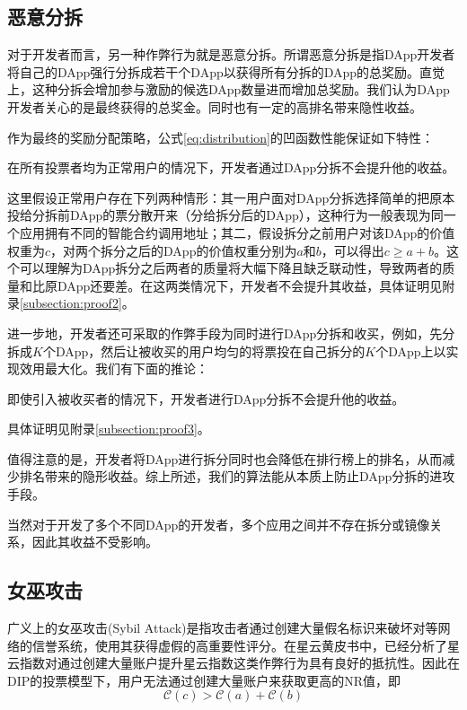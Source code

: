 \subsection{恶意分拆}

对于开发者而言，另一种作弊行为就是恶意分拆。所谓恶意分拆是指DApp开发者将自己的DApp强行分拆成若干个DApp以获得所有分拆的DApp的总奖励。直觉上，这种分拆会增加参与激励的候选DApp数量进而增加总奖励。我们认为DApp开发者关心的是最终获得的总奖金。同时也有一定的高排名带来隐性收益。

作为最终的奖励分配策略，公式\ref{eq:distribution}的凹函数性能保证如下特性：
\begin{property}
	在所有投票者均为正常用户的情况下，开发者通过DApp分拆不会提升他的收益。
\end{property}
这里假设正常用户存在下列两种情形：其一用户面对DApp分拆选择简单的把原本投给分拆前DApp的票分散开来（分给拆分后的DApp），这种行为一般表现为同一个应用拥有不同的智能合约调用地址；其二，假设拆分之前用户对该DApp的价值权重为$c$，对两个拆分之后的DApp的价值权重分别为$a$和$b$，可以得出$c \geq a+b$。这个可以理解为DApp拆分之后两者的质量将大幅下降且缺乏联动性，导致两者的质量和比原DApp还要差。在这两类情况下，开发者不会提升其收益，具体证明见附录\ref{subsection:proof2}。

进一步地，开发者还可采取的作弊手段为同时进行DApp分拆和收买，例如，先分拆成$K$个DApp，然后让被收买的用户均匀的将票投在自己拆分的$K$个DApp上以实现效用最大化。我们有下面的推论：
\begin{corollary}
	即使引入被收买者的情况下，开发者进行DApp分拆不会提升他的收益。
\end{corollary}
具体证明见附录\ref{subsection:proof3}。

值得注意的是，开发者将DApp进行拆分同时也会降低在排行榜上的排名，从而减少排名带来的隐形收益。综上所述，我们的算法能从本质上防止DApp分拆的进攻手段。

当然对于开发了多个不同DApp的开发者，多个应用之间并不存在拆分或镜像关系，因此其收益不受影响。

\subsection{女巫攻击}
广义上的女巫攻击(Sybil Attack)是指攻击者通过创建大量假名标识来破坏对等网络的信誉系统，使用其获得虚假的高重要性评分\cite{quercia2010sybil}。在星云黄皮书中，已经分析了星云指数对通过创建大量账户提升星云指数这类作弊行为具有良好的抵抗性\cite{Nabulasyellowpaper}。因此在DIP的投票模型下，用户无法通过创建大量账户来获取更高的NR值，即%
$$\mathcal{C}(c)>\mathcal{C}(a)+\mathcal{C}(b)$$

